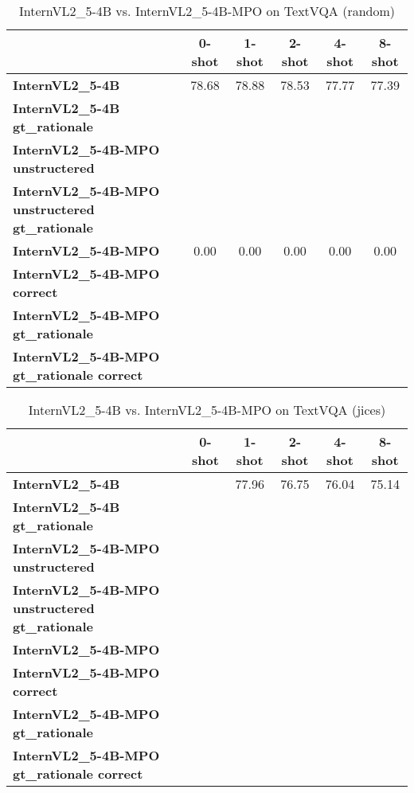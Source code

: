 \begin{table}
\caption{InternVL2\_5-4B vs. InternVL2\_5-4B-MPO on TextVQA (random)}
\label{tab:InternVL2_5-4B_TextVQA_TRAIN_random}
\begin{tabular}{lccccc}
\toprule
 & 0-shot & 1-shot & 2-shot & 4-shot & 8-shot \\
\midrule
\textbf{InternVL2\_5-4B} & 78.68 & 78.88 & 78.53 & 77.77 & 77.39 \\
\textbf{InternVL2\_5-4B gt\_rationale} &  &  &  &  &  \\
\textbf{InternVL2\_5-4B-MPO unstructered} &  &  &  &  &  \\
\textbf{InternVL2\_5-4B-MPO unstructered gt\_rationale} &  &  &  &  &  \\
\textbf{InternVL2\_5-4B-MPO} & 0.00 & 0.00 & 0.00 & 0.00 & 0.00 \\
\textbf{InternVL2\_5-4B-MPO correct} &  &  &  &  &  \\
\textbf{InternVL2\_5-4B-MPO gt\_rationale} &  &  &  &  &  \\
\textbf{InternVL2\_5-4B-MPO gt\_rationale correct} &  &  &  &  &  \\
\bottomrule
\end{tabular}
\end{table}


\begin{table}
\caption{InternVL2\_5-4B vs. InternVL2\_5-4B-MPO on TextVQA (jices)}
\label{tab:InternVL2_5-4B_TextVQA_TRAIN_jices}
\begin{tabular}{lccccc}
\toprule
 & 0-shot & 1-shot & 2-shot & 4-shot & 8-shot \\
\midrule
\textbf{InternVL2\_5-4B} &  & 77.96 & 76.75 & 76.04 & 75.14 \\
\textbf{InternVL2\_5-4B gt\_rationale} &  &  &  &  &  \\
\textbf{InternVL2\_5-4B-MPO unstructered} &  &  &  &  &  \\
\textbf{InternVL2\_5-4B-MPO unstructered gt\_rationale} &  &  &  &  &  \\
\textbf{InternVL2\_5-4B-MPO} &  &  &  &  &  \\
\textbf{InternVL2\_5-4B-MPO correct} &  &  &  &  &  \\
\textbf{InternVL2\_5-4B-MPO gt\_rationale} &  &  &  &  &  \\
\textbf{InternVL2\_5-4B-MPO gt\_rationale correct} &  &  &  &  &  \\
\bottomrule
\end{tabular}
\end{table}


